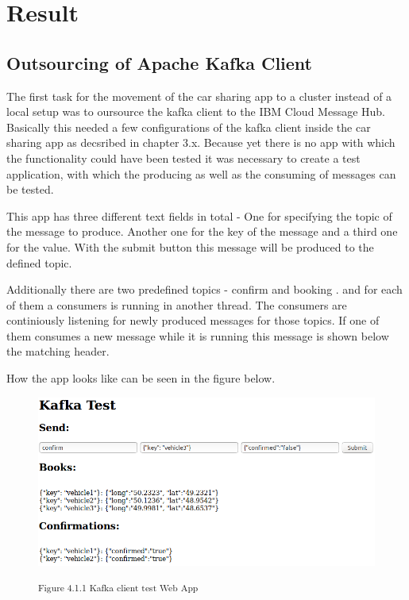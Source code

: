 
\chapter{Result}

\section{Outsourcing of Apache Kafka Client}

The first task for the movement of the car sharing app to a cluster instead of a local setup was to oursource the kafka client to the IBM Cloud Message Hub. Basically this needed a few configurations of the kafka client inside the car sharing app as decsribed in chapter 3.x. Because yet there is no app with which the functionality could have been tested it was necessary to create a test application, with which the producing as well as the consuming of messages can be tested.

This app has three different text fields in total - One for specifying the topic of the message to produce. Another one for the key of the message and a third one for the value. With the submit button this message will be produced to the defined topic.

Additionally there are two predefined topics - confirm and booking . and for each of them a consumers is running in another thread. The consumers are continiously listening for newly produced messages for those topics. If one of them consumes a new message while it is running this message is shown below the matching header.

How the app looks like can be seen in the figure below.

\begin{figure}[h]
\centering
\includegraphics[width=\textwidth/5*4]{images/kafka_test_ui.png}

\textsuperscript{Figure 4.1.1 Kafka client test Web App}\\
\end{figure}

